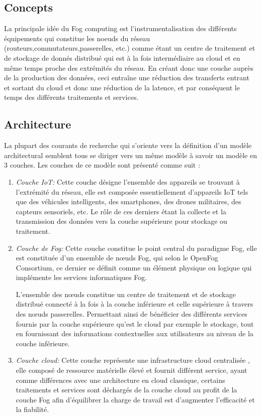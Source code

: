 \subsection{Concepts}
La principale idée du Fog computing est l'instrumentalisation des différents équipements qui constitue les noeuds du réseau (routeurs,commutateurs,passerelles, etc.) comme étant un centre de traitement et de stockage de donnés distribué qui est à la fois intermédiaire au cloud et en même temps proche des extrémités du réseau.
En créant donc une couche auprès de la production des données, ceci entraîne une réduction des transferts entrant et sortant du cloud et donc une réduction de la latence, et par conséquent le temps des différents traitements et services.
\subsection{Architecture}
La plupart des courants de recherche qui s’oriente vers la définition d’un modèle architectural semblent tous se diriger vers un même modèle à savoir un modèle en 3 couches\cite{de2019}.
Les couches de ce modèle sont présenté comme suit :
\begin{enumerate}
  \item \emph{Couche IoT:} Cette couche désigne l'ensemble des appareils se trouvant à l'extrémité du réseau, elle est composée essentiellement d'appareils IoT tels que des véhicules intelligents, des smartphones, des drones militaires, des capteurs sensoriels, etc. Le rôle de ces derniers étant la collecte et la transmission des données vers la couche supérieure pour stockage ou traitement.
  \item \emph{Couche de Fog:} Cette couche constitue le point central du paradigme Fog, elle est constituée d'un ensemble de nœuds Fog, qui selon le OpenFog Consortium, ce dernier se définit comme 
  \og{}un élément physique ou logique qui implémente les services informatiques Fog\fg\cite{de2019}.\par
  L'ensemble des nœuds constitue un centre de traitement et de stockage distribué connecté à la fois à la couche inférieure et celle supérieure à travers des nœuds passerelles. Permettant ainsi de bénéficier des différents services fournis par la couche supérieure qu’est le cloud par exemple le stockage, tout en fournissant des informations contextuelles aux utilisateurs au niveau de la couche inférieure.
  \item \emph{Couche cloud:} Cette couche représente une infrastructure cloud centralisée , elle composé de ressource matérielle élevé et fournit différent service, ayant comme différences avec une architecture en cloud classique, certains traitements et services sont déchargés de la couche cloud au profit de la couche Fog afin d'équilibrer la charge de travail est d'augmenter l'efficacité et la fiabilité.
\end{enumerate}
